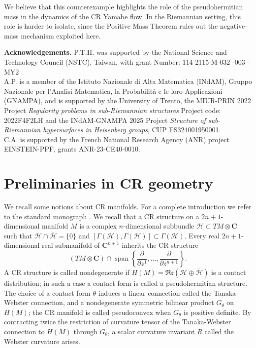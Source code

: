 \documentclass[10pt,a4paper]{amsart}
\newcommand{\de}{\partial}
\newcommand{\C}{\mathbf{C}}
\newcommand{\ci}[1]{\mathscr{#1}}%
\newcommand{\g}[1]{\mathfrak{#1}}
\begin{document}
We believe that this counterexample highlights the role of the
pseudohermitian mass in the dynamics of the CR Yamabe flow. In the
Riemannian setting, this role is harder to isolate, since the Positive
Mass Theorem rules out the negative-mass mechanism exploited here.

\vspace{15pt}

\textbf{Acknowledgements.}
P.T.H. was supported  by the National Science and Technology Council (NSTC),
Taiwan, with grant Number: 114-2115-M-032 -003 -MY2\\
A.P. is a member of the Istituto Nazionale di Alta Matematica (INdAM), Gruppo Nazionale per l'Analisi Matematica, la Probabilità e le loro Applicazioni (GNAMPA), and is supported by the University of Trento, the MIUR-PRIN 2022 Project \emph{Regularity problems in sub-Riemannian structures}  Project code: 2022F4F2LH and the INdAM-GNAMPA 2025 Project \emph{Structure of sub-Riemannian hypersurfaces in Heisenberg groups}, CUP ES324001950001.\\
C.A. is supported by the French National Research Agency (ANR) project  EINSTEIN-PPF, grants ANR-23-CE40-0010.

\section{Preliminaries in CR geometry}\label{Section2}
We recall some notions about CR manifolds. For a complete introduction we refer to the standard monograph \cite{DT}.
We recall that a CR structure on a $2n+1$-dimensional manifold $M$ is a complex $n$-dimensional subbundle $\ci{H}\subset TM\otimes\C$ such that $\ci{H}\cap\overline{\ci{H}}=\{0\}$ and $[\Gamma(\ci{H}),\Gamma(\ci{H})]\subset\Gamma(\ci{H})$.
Every real $2n+1$-dimensional real submanifold of $\C^{n+1}$ inherits the CR structure
$$(TM\otimes\C)\cap\operatorname{span}\left\{\frac{\de}{\de z^1},\ldots,\frac{\de}{\de z^{n+1}}\right\}.$$
A CR structure is called nondegenerate if $H(M)=\g{Re}(\ci{H}\oplus\overline{\ci{H}})$ is a contact distribution; in such a case a contact form is called a pseudohermitian structure. The choice of a contact form $\theta$ induces a linear connection called the Tanaka-Webster connection, and a nondegenerate symmetric bilinear product $G_{\theta}$ on $H(M)$; the CR manifold is called pseudoconvex when $G_{\theta}$ is positive definite. By contracting twice the restriction of curvature tensor of the Tanaka-Webster connection to $H(M)$ through $G_{\theta}$, a scalar curvature invariant $R$ called the Webster curvature arises.
\end{document}
